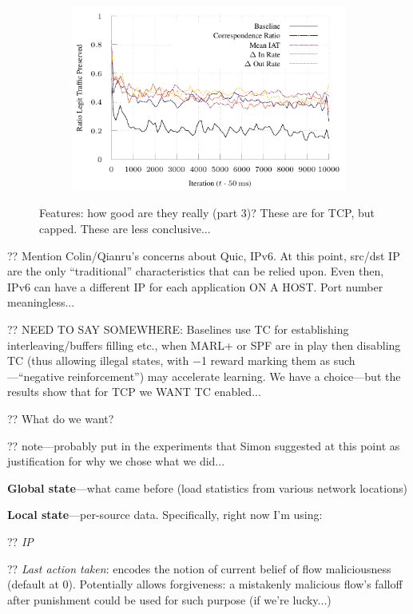 \documentclass[conference, letterpaper, 10pt, times]{IEEEtran}
\begin{document}
\begin{figure}
\begin{subfigure}{0.32\linewidth}
		\includegraphics[width=\linewidth]{../plots/ftprep-tcp-cap-good-2}
	\end{subfigure}
	
	\caption{
		Features: how good are they really (part 3)? These are for TCP, but capped. These are less conclusive...
		\label{fig:tcp-cap-feature-plots}
	}
\end{figure}

?? Mention Colin/Qianru's concerns about Quic, IPv6. At this point, src/dst IP are the only ``traditional'' characteristics that can be relied upon. Even then, IPv6 can have a different IP for each application ON A HOST. Port number meaningless...

?? NEED TO SAY SOMEWHERE: Baselines use TC for establishing interleaving/buffers filling etc., when MARL+ or SPF are in play then disabling TC (thus allowing illegal states, with \num{-1} reward marking them as such---``negative reinforcement'') may accelerate learning. We have a choice---but the results show that for TCP we WANT TC enabled...

?? What do we want?

?? note---probably put in the experiments that Simon suggested at this point as justification for why we chose what we did...

\textbf{Global state}---what came before (load statistics from various network locations)

\textbf{Local state}---per-source data. Specifically, right now I'm using:

?? \emph{IP}

?? \emph{Last action taken}: encodes the notion of current belief of flow maliciousness (default at 0). Potentially allows forgiveness: a mistakenly malicious flow's falloff after punishment could be used for such purpose (if we're lucky...)
\end{document}

